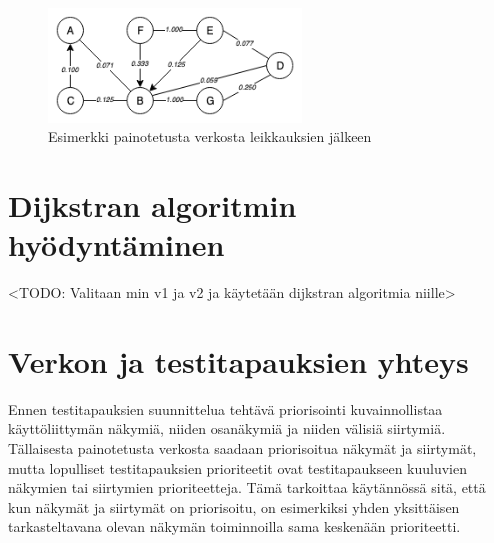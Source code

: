   \begin{figure}[H]
    \centering
    \includegraphics[width=0.6\textwidth]{assets/painotettu-verkko-jalkeen.png}
    \caption{Esimerkki painotetusta verkosta leikkauksien jälkeen}
    \label{fig:painotettu-verkko-jalkeen}
  \end{figure}

\section{Dijkstran algoritmin hyödyntäminen} \label{ch:10_dijkstran_algoritmin_hyodyntaminen}

  <TODO: Valitaan min v1 ja v2 ja käytetään dijkstran algoritmia niille>

\section{Verkon ja testitapauksien yhteys} \label{ch:10_verkon_ja_testitapauksien_yhteys}

  Ennen testitapauksien suunnittelua tehtävä priorisointi kuvainnollistaa käyttöliittymän näkymiä, niiden osanäkymiä ja niiden välisiä siirtymiä.
  Tällaisesta painotetusta verkosta saadaan priorisoitua näkymät ja siirtymät, mutta lopulliset testitapauksien prioriteetit ovat testitapaukseen kuuluvien näkymien tai siirtymien prioriteetteja.
  Tämä tarkoittaa käytännössä sitä, että kun näkymät ja siirtymät on priorisoitu, on esimerkiksi yhden yksittäisen tarkasteltavana olevan näkymän toiminnoilla sama keskenään prioriteetti.

